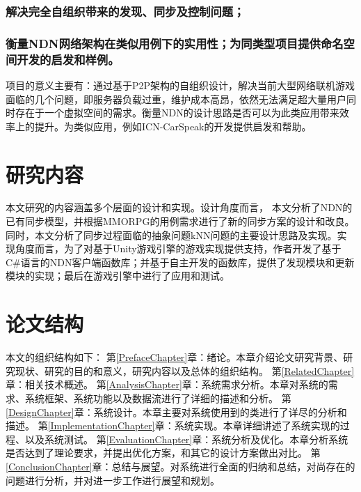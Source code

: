 \subsubsection{解决完全自组织带来的发现、同步及控制问题；}
\subsubsection{衡量NDN网络架构在类似用例下的实用性；为同类型项目提供命名空间开发的启发和样例。}
\par
项目的意义主要有：通过基于P2P架构的自组织设计，解决当前大型网络联机游戏面临的几个问题，即服务器负载过重，维护成本高昂，依然无法满足超大量用户同时存在于一个虚拟空间的需求。衡量NDN的设计思路是否可以为此类应用带来效率上的提升。为类似应用，例如ICN-CarSpeak\cite{V2VUseCaseRef}的开发提供启发和帮助。
\section{研究内容}
\par
本文研究的内容涵盖多个层面的设计和实现。设计角度而言， 本文分析了NDN的已有同步模型，并根据MMORPG的用例需求进行了新的同步方案的设计和改良。同时，本文分析了同步过程面临的抽象问题kNN问题的主要设计思路及实现。实现角度而言，为了对基于Unity游戏引擎的游戏实现提供支持，作者开发了基于C\#语言的NDN客户端函数库；并基于自主开发的函数库，提供了发现模块和更新模块的实现；最后在游戏引擎中进行了应用和测试。
\section{论文结构}
\par
本文的组织结构如下：
第\ref{PrefaceChapter}章：绪论。本章介绍论文研究背景、研究现状、研究的目的和意义，研究内容以及总体的组织结构。
第\ref{RelatedChapter}章：相关技术概述。 
第\ref{AnalysisChapter}章：系统需求分析。本章对系统的需求、系统框架、系统功能以及数据流进行了详细的描述和分析。
第\ref{DesignChapter}章：系统设计。本章主要对系统使用到的类进行了详尽的分析和描述。 
第\ref{ImplementationChapter}章：系统实现。本章详细讲述了系统实现的过程、以及系统测试。
第\ref{EvaluationChapter}章：系统分析及优化。本章分析系统是否达到了理论要求，并提出优化方案，和其它的设计方案做出对比。
第\ref{ConclusionChapter}章：总结与展望。对系统进行全面的归纳和总结，对尚存在的问题进行分析，并对进一步工作进行展望和规划。

